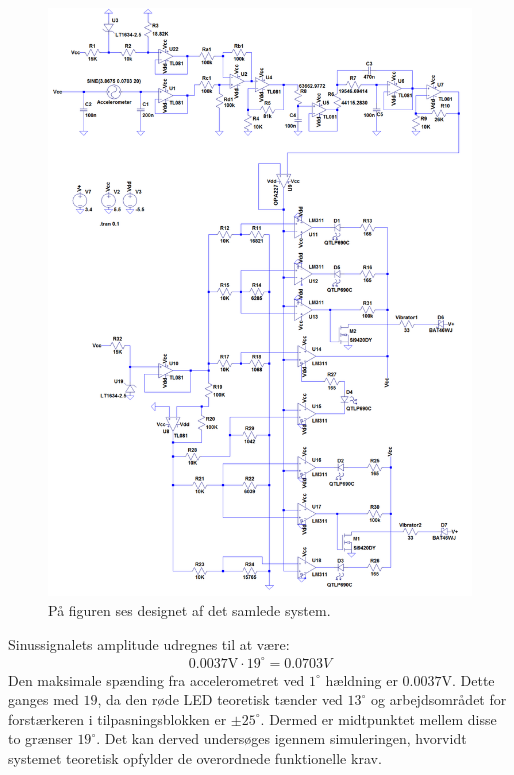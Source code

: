 \begin{figure}[H]
	\centering
	\includegraphics[scale=.4]{figures/cProblemloesning/Samlet_systemUL2.PNG}
	\caption{På figuren ses designet af det samlede system.}
	\label{fig:samlet_system}
\end{figure}
\noindent Sinussignalets amplitude udregnes til at være:
\begin{eqnarray}
0.0037\text{V} \cdot 19^{\circ} = 0.0703V
\end{eqnarray}
\noindent Den maksimale spænding fra accelerometret ved $1^{\circ}$ hældning er $0.0037$V. Dette ganges med $19$, da den røde LED teoretisk tænder ved $13^{\circ}$ og arbejdsområdet for forstærkeren i tilpasningsblokken er $\pm25^{\circ}$. Dermed er midtpunktet mellem disse to grænser $19^{\circ}$. Det kan derved undersøges igennem simuleringen, hvorvidt systemet teoretisk opfylder de overordnede funktionelle krav.\\
